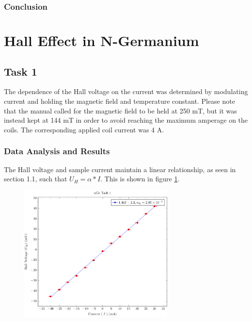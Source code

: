 \documentclass[a4paper]{article}
\begin{document}
\subsubsection{Conclusion}

\section{Hall Effect in N-Germanium}

\subsection{Task 1}

\qq The dependence of the Hall voltage on the current was determined 
by modulating current and holding the magnetic field and temperature 
constant. Please note that the manual called for the magnetic field to 
be held at 250 mT, but it was instead kept at 144 mT in order to 
avoid reaching the maximum amperage on the coils. The corresponding
applied coil current was 4 A.

\subsubsection{Data Analysis and Results}
\qq The Hall voltage and sample current maintain a linear
relationship, as seen in section 1.1, such that $U_H = \alpha *
I$. This is shown in figure \ref{task31plot}.

\begin{figure}[H]
\centering
\includegraphics[width=0.7\textwidth]{NGePlots/Task1/nGeTask1.pdf}
\label{task31plot}
\end{figure}
\end{document}
